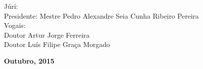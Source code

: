 \begin{titlepage}
\begin{center}
\begin{tabbing}
		\end{tabbing}
		\begin{tabbing}
		   \fontsize{12pt}{10pt}\selectfont
		   Júri: \\
		   \fontsize{11pt}{10pt}\selectfont
		   \hspace{1.1cm}Presidente: Mestre Pedro Alexandre Seia Cunha Ribeiro Pereira \\
		   \fontsize{11pt}{10pt}\selectfont
		   \hspace{1.1cm}Vogais: \\
		   \fontsize{11pt}{10pt}\selectfont
		   \hspace{2.2cm}Doutor Artur Jorge Ferreira \\
		   \fontsize{11pt}{10pt}\selectfont
		   \hspace{2.2cm}Doutor Luís Filipe Graça Morgado\\
		\end{tabbing}
		
		\fontsize{10pt}{10pt}\selectfont
		\textbf{Outubro, 2015}
	\end{center}

	\newpage
	\thispagestyle{empty}
	\cleardoublepage
	\newpage
	\thispagestyle{empty}
	

\end{titlepage}
